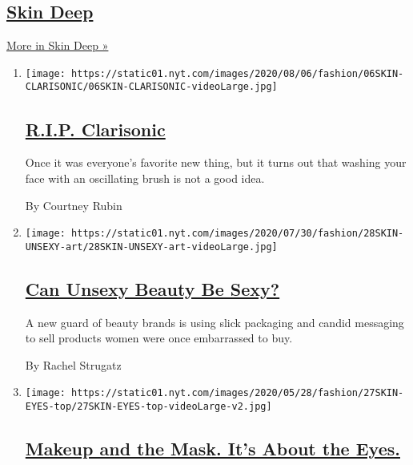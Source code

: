 \hypertarget{skin-deep}{%
\subsection{\texorpdfstring{\href{/column/skin-deep}{Skin
Deep}}{Skin Deep}}\label{skin-deep}}

\href{/column/skin-deep}{More in Skin Deep »}

\begin{enumerate}
\def\labelenumi{\arabic{enumi}.}
\item
  \texttt{[image: https://static01.nyt.com/images/2020/08/06/fashion/06SKIN-CLARISONIC/06SKIN-CLARISONIC-videoLarge.jpg]}

  \hypertarget{rip-clarisonic}{%
  \subsection{\texorpdfstring{\href{/2020/08/05/style/skin-care-rip-clarisonic.html}{R.I.P.
  Clarisonic}}{R.I.P. Clarisonic}}\label{rip-clarisonic}}

  Once it was everyone's favorite new thing, but it turns out that
  washing your face with an oscillating brush is not a good idea.

  By Courtney Rubin
\item
  \texttt{[image: https://static01.nyt.com/images/2020/07/30/fashion/28SKIN-UNSEXY-art/28SKIN-UNSEXY-art-videoLarge.jpg]}

  \hypertarget{can-unsexy-beauty-be-sexy}{%
  \subsection{\texorpdfstring{\href{/2020/07/28/style/can-unsexy-beauty-be-sexy.html}{Can
  Unsexy Beauty Be
  Sexy?}}{Can Unsexy Beauty Be Sexy?}}\label{can-unsexy-beauty-be-sexy}}

  A new guard of beauty brands is using slick packaging and candid
  messaging to sell products women were once embarrassed to buy.

  By Rachel Strugatz
\item
  \texttt{[image: https://static01.nyt.com/images/2020/05/28/fashion/27SKIN-EYES-top/27SKIN-EYES-top-videoLarge-v2.jpg]}

  \hypertarget{makeup-and-the-mask-its-about-the-eyes}{%
  \subsection{\texorpdfstring{\href{/2020/05/26/style/makeup-and-the-mask-its-about-the-eyes.html}{Makeup
  and the Mask. It's About the
  Eyes.}}{Makeup and the Mask. It's About the Eyes.}}\label{makeup-and-the-mask-its-about-the-eyes}}


\end{enumerate}
